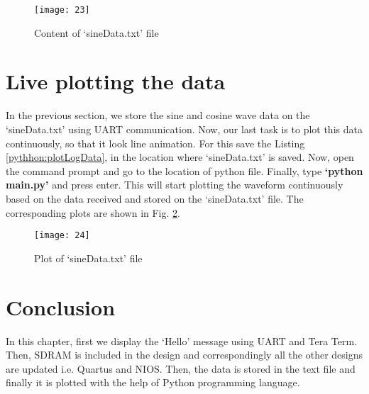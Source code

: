 \begin{figure}[!h]
	\centering
	\texttt{[image: 23]}
	\caption{Content of `sineData.txt' file}
	\label{fig:contentLogFile}
\end{figure}

\section{Live plotting the data}
In the previous section, we store the sine and cosine wave data on the `sineData.txt' using UART communication. Now, our last task is to plot this data continuously, so that it look line animation. For this save the Listing \ref{pythhon:plotLogData}, in the location where `sineData.txt' is saved. Now, open the command prompt and go to the location of python file. Finally, type \textbf{`python main.py'} and press enter. This will start plotting the waveform continuously based on the data received and stored on the `sineData.txt' file. The corresponding plots are shown in Fig. \ref{fig:plotLogFile}.



\begin{figure}[!h]
	\centering
	\texttt{[image: 24]}
	\caption{Plot of `sineData.txt' file}
	\label{fig:plotLogFile}
\end{figure}


\section{Conclusion}
In this chapter, first we display the `Hello' message using UART and Tera Term. Then, SDRAM is included in the design and correspondingly all the other designs are updated i.e. Quartus and NIOS. Then, the data is stored in the text file and finally it is plotted with the help of Python programming language. 
